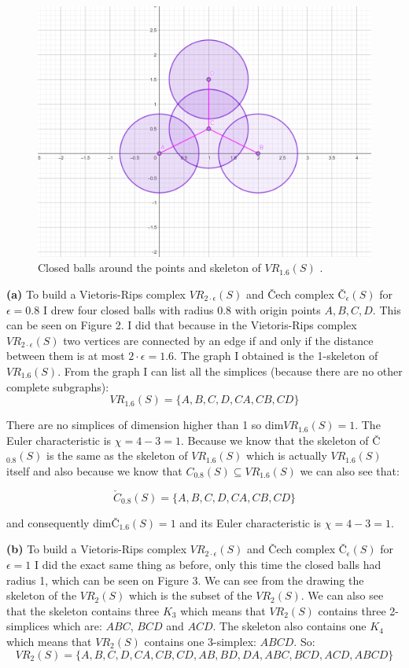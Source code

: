 \documentclass[12pt]{article}
\begin{document}
	\begin{figure}
		\centering
		\includegraphics[scale=0.20] {graf3}
		\caption{\label{fig:1} Closed balls around the points and skeleton of $VR_{1.6}(S)$ . }
	\end{figure}
	
	\textbf{(a)}  To build a Vietoris-Rips complex $VR_{2\cdot \epsilon}(S)$ and Čech complex Č$_{\epsilon}(S)$ for $\epsilon = 0.8$ I drew four closed balls with radius 0.8 with origin points $A,B,C,D$. This can be seen on Figure 2. I did that because in the Vietoris-Rips complex $VR_{2\cdot \epsilon}(S)$ two vertices are connected by an edge if and only if the distance between them is at most $2\cdot \epsilon = 1.6$. The graph I obtained is the 1-skeleton of $VR_{1.6}(S)$. From the graph I can list all the simplices (because there are no other complete subgraphs): 
	 $$VR_{1.6}(S) = \{A,B,C,D,CA,CB,CD\}$$
	 
	 There are no simplices of dimension higher than 1 so dim$VR_{1.6}(S) = 1$. The Euler characteristic is $\chi = 4-3=1$. Because we know that the skeleton of Č$_{0.8}(S)$ is the same as the skeleton of $VR_{1.6}(S)$ which is actually $VR_{1.6}(S)$ itself and also because we know that $C_{0.8}(S) \subseteq VR_{1.6}(S)$ we can also see that:
	 
	  $$\check{C}_{0.8}(S) = \{A,B,C,D,CA,CB,CD\}$$ 
	  
	  and consequently dimČ$_{1.6}(S) = 1$ and its Euler characteristic is  $\chi = 4-3=1$.
	  
	  \textbf{(b)} To build a Vietoris-Rips complex $VR_{2\cdot \epsilon}(S)$ and Čech complex Č$_{\epsilon}(S)$ for $\epsilon = 1$ I did the exact same thing as before, only this time the closed balls had radius 1, which can be seen on Figure 3. We can see from the drawing the skeleton of the $VR_{2}(S)$ which is the subset of the $VR_{2}(S)$. We can also see that the skeleton contains three $K_3$ which means that $VR_{2}(S)$ contains three 2-simplices which are: $ABC$, $BCD$ and $ACD$. The skeleton also contains one $K_4$ which means that $VR_{2}(S)$ contains one 3-simplex: $ABCD$. So:
	  $$VR_{2}(S) = \{A,B,C,D,CA,CB,CD,AB,BD,DA,ABC,BCD,ACD,ABCD\}$$
	  
\end{document}
